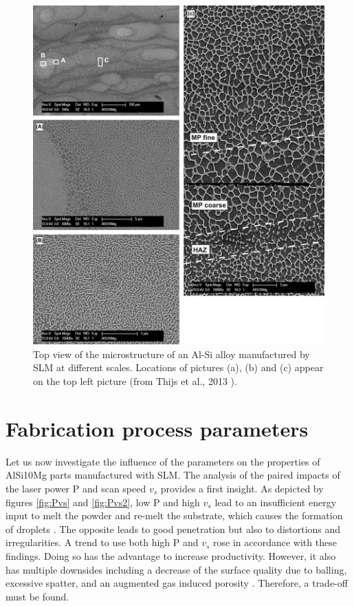 \begin{figure}[ht]
	\centering
	\includegraphics[scale=0.40]{Images/micro_am}
	\decoRule
	\caption[Top view of the microstructure of an Al-Si alloy manufactured by SLM at different scales. Locations of pictures (a), (b) and (c) appear on the top left picture]{Top view of the microstructure of an Al-Si alloy manufactured by SLM at different scales. Locations of pictures (a), (b) and (c) appear on the top left picture (from Thijs et al., 2013 \parencite{Thijs13}).}
	\label{fig:micro_am}
\end{figure}

\section{Fabrication process parameters}
\label{pp}
Let us now investigate the influence of the parameters on the properties of AlSi10Mg parts manufactured with SLM. The analysis of the paired impacts of the laser power P and scan speed $v_s$ provides a first insight. As depicted by figures \ref{fig:Pvs} and \ref{fig:Pvs2}, low P and high $v_s$ lead to an insufficient energy input to melt the powder and re-melt the substrate, which causes the formation of droplets \parencite{Kempen110817} . The opposite leads to good penetration but also to distortions and irregularities.   A trend to use both high P and $v_s$ rose in accordance with these findings. Doing so has the advantage to increase productivity. However, it also has multiple downsides including a decrease of the surface quality due to balling, excessive spatter, and an augmented gas induced porosity \parencite{Mertens170406}. Therefore, a trade-off must be found. \\

